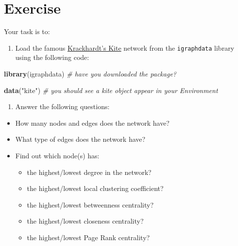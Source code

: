 \documentclass[
]{book}
\newenvironment{Shaded}{\begin{snugshade}}{\end{snugshade}}
\newcommand{\CommentTok}[1]{\textcolor[rgb]{0.56,0.35,0.01}{\textit{#1}}}
\newcommand{\FunctionTok}[1]{\textcolor[rgb]{0.13,0.29,0.53}{\textbf{#1}}}
\newcommand{\NormalTok}[1]{#1}
\newcommand{\StringTok}[1]{\textcolor[rgb]{0.31,0.60,0.02}{#1}}
\providecommand{\tightlist}{%
  \setlength{\itemsep}{0pt}\setlength{\parskip}{0pt}}
\begin{document}
\section{Exercise}\label{exercise-7}

Your task is to:

\begin{enumerate}
\def\labelenumi{\arabic{enumi}.}
\tightlist
\item
  Load the famous \href{https://en.wikipedia.org/wiki/Krackhardt_kite_graph}{Krackhardt's Kite} network from the \texttt{igraphdata} library using the following code:
\end{enumerate}

\begin{Shaded}
\begin{Highlighting}[]
\FunctionTok{library}\NormalTok{(igraphdata) }\CommentTok{\# have you downloaded the package? }

\FunctionTok{data}\NormalTok{(}\StringTok{"kite"}\NormalTok{) }\CommentTok{\# you should see a kite object appear in your Environment}
\end{Highlighting}
\end{Shaded}

\begin{enumerate}
\def\labelenumi{\arabic{enumi}.}
\setcounter{enumi}{1}
\tightlist
\item
  Answer the following questions:
\end{enumerate}

\begin{itemize}
\item
  How many nodes and edges does the network have?
\item
  What type of edges does the network have?
\item
  Find out which node(s) has:

  \begin{itemize}
  \tightlist
  \item
    the highest/lowest degree in the network?
  \item
    the highest/lowest local clustering coefficient?
  \item
    the highest/lowest betweenness centrality?
  \item
    the highest/lowest closeness centrality?
  \item
    the highest/lowest Page Rank centrality?
  \end{itemize}
\end{itemize}
\end{document}
